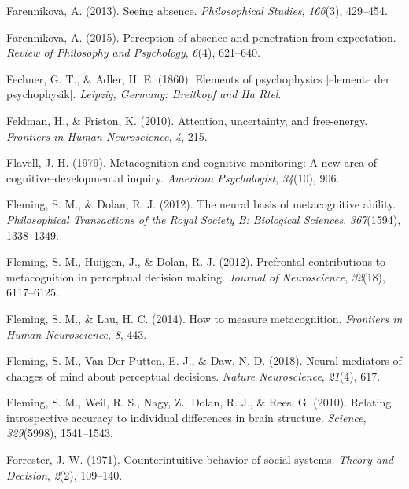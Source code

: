 \documentclass[12pt,twoside]{reedthesis}
\newenvironment{CSLReferences}%
  {}%
  {\par}
\begin{document}
\begin{CSLReferences}{1}{0}
\leavevmode\hypertarget{ref-farennikova2013seeing}{}%
Farennikova, A. (2013). Seeing absence. \emph{Philosophical Studies}, \emph{166}(3), 429--454.

\leavevmode\hypertarget{ref-farennikova2015perception}{}%
Farennikova, A. (2015). Perception of absence and penetration from expectation. \emph{Review of Philosophy and Psychology}, \emph{6}(4), 621--640.

\leavevmode\hypertarget{ref-fechner1860elements}{}%
Fechner, G. T., \& Adler, H. E. (1860). Elements of psychophysics {[}elemente der psychophysik{]}. \emph{Leipzig, Germany: Breitkopf and Ha Rtel}.

\leavevmode\hypertarget{ref-feldman2010attention}{}%
Feldman, H., \& Friston, K. (2010). Attention, uncertainty, and free-energy. \emph{Frontiers in Human Neuroscience}, \emph{4}, 215.

\leavevmode\hypertarget{ref-flavell1979metacognition}{}%
Flavell, J. H. (1979). Metacognition and cognitive monitoring: A new area of cognitive--developmental inquiry. \emph{American Psychologist}, \emph{34}(10), 906.

\leavevmode\hypertarget{ref-fleming2012neural}{}%
Fleming, S. M., \& Dolan, R. J. (2012). The neural basis of metacognitive ability. \emph{Philosophical Transactions of the Royal Society B: Biological Sciences}, \emph{367}(1594), 1338--1349.

\leavevmode\hypertarget{ref-fleming2012prefrontal}{}%
Fleming, S. M., Huijgen, J., \& Dolan, R. J. (2012). Prefrontal contributions to metacognition in perceptual decision making. \emph{Journal of Neuroscience}, \emph{32}(18), 6117--6125.

\leavevmode\hypertarget{ref-fleming2014measure}{}%
Fleming, S. M., \& Lau, H. C. (2014). How to measure metacognition. \emph{Frontiers in Human Neuroscience}, \emph{8}, 443.

\leavevmode\hypertarget{ref-fleming2018neural}{}%
Fleming, S. M., Van Der Putten, E. J., \& Daw, N. D. (2018). Neural mediators of changes of mind about perceptual decisions. \emph{Nature Neuroscience}, \emph{21}(4), 617.

\leavevmode\hypertarget{ref-fleming2010relating}{}%
Fleming, S. M., Weil, R. S., Nagy, Z., Dolan, R. J., \& Rees, G. (2010). Relating introspective accuracy to individual differences in brain structure. \emph{Science}, \emph{329}(5998), 1541--1543.

\leavevmode\hypertarget{ref-forrester1971counterintuitive}{}%
Forrester, J. W. (1971). Counterintuitive behavior of social systems. \emph{Theory and Decision}, \emph{2}(2), 109--140.


\end{CSLReferences}
\end{document}
